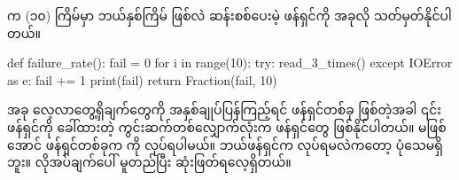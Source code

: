  က (၁၀) ကြိမ်မှာ ဘယ်နှစ်ကြိမ်  ဖြစ်လဲ ဆန်းစစ်ပေးမဲ့ ဖန်ရှင်ကို အခုလို သတ်မှတ်နိုင်ပါတယ်။ 
%
\begin{py}
def failure_rate():
    fail = 0
    for i in range(10):
        try:
            read_3_times()
        except IOError as e:
            fail += 1
    print(fail)
    return Fraction(fail, 10)
\end{py}
%

အခု လေ့လာတွေ့ရှိချက်တွေကို အနှစ်ချုပ်ပြန်ကြည့်ရင် ဖန်ရှင်တစ်ခု  ဖြစ်တဲ့အခါ ၎င်းဖန်ရှင်ကို ခေါ်ထားတဲ့ ကွင်းဆက်တစ်လျှောက်လုံးက ဖန်ရှင်တွေ  ဖြစ်နိုင်ပါတယ်။  မဖြစ်အောင် ဖန်ရှင်တစ်ခုက  ကို  လုပ်ရပါမယ်။ ဘယ်ဖန်ရှင်က  လုပ်ရမလဲကတော့ ပုံသေမရှိဘူး။ လိုအပ်ချက်ပေါ် မူတည်ပြီး ဆုံးဖြတ်ရလေ့ရှိတယ်။




